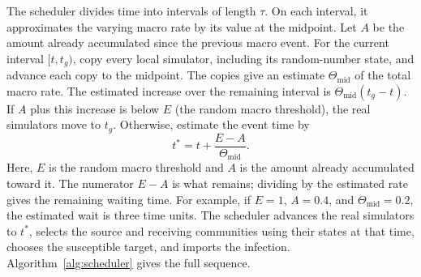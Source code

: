 \documentclass[a4paper,fleqn]{cas-sc}
\begin{document}
The scheduler divides time into intervals of length $\tau$. On each interval, it approximates the varying macro rate by its value at the midpoint. Let $A$ be the amount already accumulated since the previous macro event. For the current interval $[t,t_g)$, copy every local simulator, including its random-number state, and advance each copy to the midpoint. The copies give an estimate $\Theta_{\mathrm{mid}}$ of the total macro rate. The estimated increase over the remaining interval is $\Theta_{\mathrm{mid}}(t_g-t)$. If $A$ plus this increase is below $E$ (the random macro threshold), the real simulators move to $t_g$. Otherwise, estimate the event time by
\begin{equation}
\label{eq:interpolation}
t^\ast=t+\frac{E-A}{\Theta_{\mathrm{mid}}}.
\end{equation}
Here, $E$ is the random macro threshold and $A$ is the amount already accumulated toward it. The numerator $E-A$ is what remains; dividing by the estimated rate gives the remaining waiting time. For example, if $E=1$, $A=0.4$, and $\Theta_{\mathrm{mid}}=0.2$, the estimated wait is three time units. The scheduler advances the real simulators to $t^\ast$, selects the source and receiving communities using their states at that time, chooses the susceptible target, and imports the infection. Algorithm~\ref{alg:scheduler} gives the full sequence.
\end{document}
